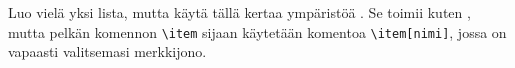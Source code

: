     \begin{harj}
    Luo vielä yksi lista, mutta käytä tällä kertaa ympäristöä . Se toimii kuten , mutta pelkän komennon \lstinline-\item- sijaan käytetään komentoa \lstinline-\item[nimi]-, jossa  on vapaasti valitsemasi merkkijono.
    \end{harj}
